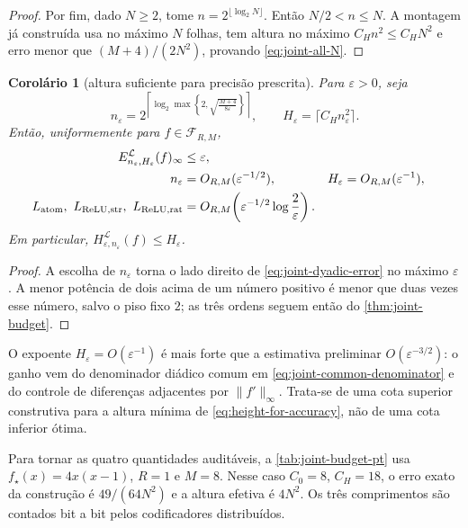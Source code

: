 \documentclass[11pt,a4paper]{article}
\newtheorem{corollary}[theorem]{Corolário}
\theoremstyle{definition}
\theoremstyle{remark}
\newcommand{\Library}{\mathcal{L}}
\begin{document}
\begin{proof}
Por fim, dado $N\ge2$, tome $n=2^{\lfloor\log_2N\rfloor}$. Então
$N/2<n\le N$. A montagem já construída usa no máximo $N$ folhas, tem altura
no máximo $C_Hn^2\le C_HN^2$ e erro menor que
$(M+4)/(2N^2)$, provando \eqref{eq:joint-all-N}.
\end{proof}

\begin{corollary}[altura suficiente para precisão prescrita]
\label{cor:height-for-epsilon}
Para $\varepsilon>0$, seja
\begin{equation}
 n_\varepsilon
 =2^{\left\lceil\log_2\max\left\{2,
        \sqrt{\frac{M+4}{8\varepsilon}}\right\}\right\rceil},
 \qquad
 H_\varepsilon=\lceil C_Hn_\varepsilon^2\rceil.
 \label{eq:epsilon-schedule}
\end{equation}
Então, uniformemente para $f\in\mathcal F_{R,M}$,
\begin{align}
 E_{n_\varepsilon,H_\varepsilon}^{\Library}(f)_\infty
 &\le\varepsilon,\label{eq:epsilon-joint-error}\\
 n_\varepsilon&=O_{R,M}(\varepsilon^{-1/2}),
 &H_\varepsilon&=O_{R,M}(\varepsilon^{-1}),
 \label{eq:epsilon-joint-height}\\
 L_{\rm atom},\ L_{\rm ReLU,str},\ L_{\rm ReLU,rat}
 &=O_{R,M}\!\left(\varepsilon^{-1/2}
                   \log\frac{2}{\varepsilon}\right).
 \label{eq:epsilon-joint-bits}
\end{align}
Em particular,
$H_{\varepsilon,n_\varepsilon}^{\Library}(f)\le H_\varepsilon$.
\end{corollary}

\begin{proof}
A escolha de $n_\varepsilon$ torna o lado direito de
\eqref{eq:joint-dyadic-error} no máximo $\varepsilon$. A menor potência de
dois acima de um número positivo é menor que duas vezes esse número, salvo o
piso fixo $2$; as três ordens seguem então do \cref{thm:joint-budget}.
\end{proof}

O expoente $H_\varepsilon=O(\varepsilon^{-1})$ é mais forte que a estimativa
preliminar $O(\varepsilon^{-3/2})$: o ganho vem do denominador diádico comum
em \eqref{eq:joint-common-denominator} e do controle de diferenças adjacentes
por $\|f'\|_\infty$. Trata-se de uma cota superior construtiva para a altura
mínima de \eqref{eq:height-for-accuracy}, não de uma cota inferior ótima.

Para tornar as quatro quantidades auditáveis, a
\cref{tab:joint-budget-pt} usa $f_\star(x)=4x(x-1)$, $R=1$ e $M=8$. Nesse
caso $C_0=8$, $C_H=18$, o erro exato da construção é
$49/(64N^2)$ e a altura efetiva é $4N^2$. Os três comprimentos são contados
bit a bit pelos codificadores distribuídos.
\end{document}
